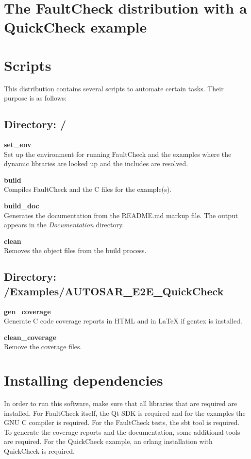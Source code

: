\section{The FaultCheck distribution with a QuickCheck
example}\label{the-faultcheck-distribution-with-a-quickcheck-example}

\section{Scripts}\label{scripts}

This distribution contains several scripts to automate certain tasks.
Their purpose is as follows:

\subsection{Directory: /}\label{directory}

\textbf{set\_env}\\Set up the environment for running FaultCheck and the
examples where the dynamic libraries are looked up and the includes are
resolved.

\textbf{build}\\Compiles FaultCheck and the C files for the example(s).

\textbf{build\_doc}\\Generates the documentation from the README.md
markup file. The output appears in the \emph{Documentation} directory.

\textbf{clean}\\Removes the object files from the build process.

\subsection{Directory:
/Examples/AUTOSAR\_E2E\_QuickCheck}\label{directory-examplesautosarux5fe2eux5fquickcheck}

\textbf{gen\_coverage}\\Generate C code coverage reports in HTML and in
LaTeX if gentex is installed.

\textbf{clean\_coverage}\\Remove the coverage files.

\section{Installing dependencies}\label{installing-dependencies}

In order to run this software, make sure that all libraries that are
required are installed. For FaultCheck itself, the Qt SDK is required
and for the examples the GNU C compiler is required. For the FaultCheck
tests, the sbt tool is required. To generate the coverage reports and
the documentation, some additional tools are required. For the
QuickCheck example, an erlang installation with QuickCheck is required.

